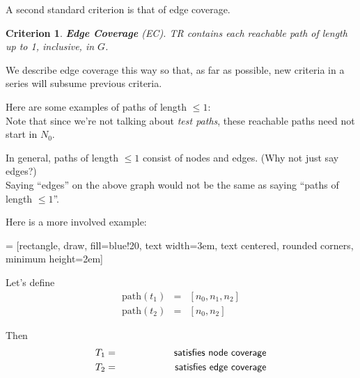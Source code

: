 \documentclass[11pt]{article}
\newtheorem{crit}{Criterion}
\begin{document}
A second standard criterion is that of edge coverage.
\begin{crit}
{\bf Edge Coverage} (EC). TR contains each reachable path of length up
to 1, inclusive, in $G$.
\end{crit}
We describe edge coverage this way so that, as far as possible, new
criteria in a series will subsume previous criteria.

{\sf Here are some examples of paths of length $\le 1$:}\\[1em]
Note that since we're not talking about \emph{test paths}, these
reachable paths need not start in $N_0$.

In general, paths of length $\le 1$ consist of nodes and edges. {\sf (Why not just
say edges?)}\\[3em]

Saying ``edges'' on the above graph would not be the same as saying ``paths
of length $\le 1$''.

\newpage
Here is a more involved example:

 = [rectangle, draw, fill=blue!20, 
    text width=3em, text centered, rounded corners, minimum height=2em]

\begin{center}
\end{center}

Let's define
\begin{eqnarray*}
\mbox{path}(t_1) &=& [n_0, n_1, n_2] \\
\mbox{path}(t_2) &=& [n_0, n_2] 
\end{eqnarray*}

Then 
\begin{eqnarray*}
T_1 &=& \hspace*{5em} \mbox{\sf satisfies node coverage}\\
T_2 &=& \hspace*{5em} \mbox{\sf satisfies edge coverage}
\end{eqnarray*}
\end{document}
